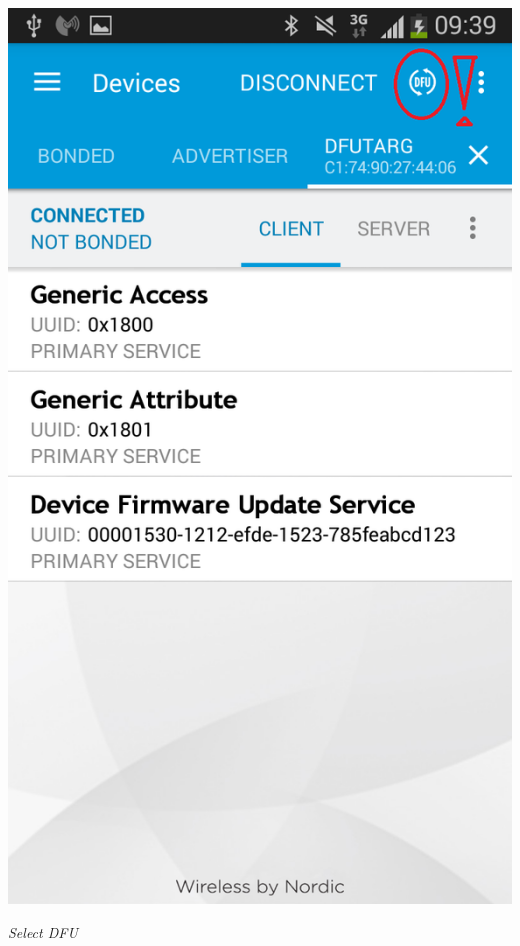 \documentclass[conference]{IEEEtran}
\begin{document}
\begin{center}
    \includegraphics[scale=0.5]{FOTA5}
    \begin{minipage}{0.6\textwidth}
    \footnotesize
    \emph{Select DFU}
    \end{minipage}
\end{center}
\end{document}
